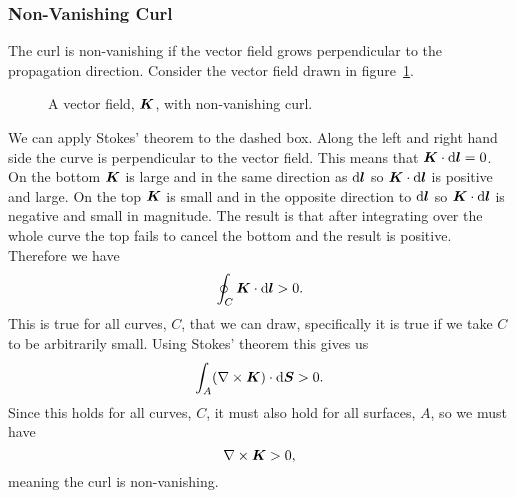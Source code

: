     \subsubsection{Non-Vanishing Curl}
    The curl is non-vanishing if the vector field grows perpendicular to the propagation direction.
    Consider the vector field drawn in figure~\ref{fig:non-vanishing curl}.
    \begin{figure}[ht]
        \centering
        \caption{A vector field, \(\bm{K}\), with non-vanishing curl.}
        \label{fig:non-vanishing curl}
    \end{figure}
    We can apply Stokes' theorem to the dashed box.
    Along the left and right hand side the curve is perpendicular to the vector field.
    This means that \(\bm{K}\cdot\dd\bm{l} = 0\).
    On the bottom \(\bm{K}\) is large and in the same direction as \(\dd\bm{l}\) so \(\bm{K}\cdot\dd\bm{l}\) is positive and large.
    On the top \(\bm{K}\) is small and in the opposite direction to \(\dd\bm{l}\) so \(\bm{K}\cdot\dd\bm{l}\) is negative and small in magnitude.
    The result is that after integrating over the whole curve the top fails to cancel the bottom and the result is positive.
    Therefore we have
    \[\oint_C \bm{K}\cdot\dd\bm{l} > 0.\]
    This is true for all curves, \(C\), that we can draw, specifically it is true if we take \(C\) to be arbitrarily small.
    Using Stokes' theorem this gives us
    \[\int_A(\nabla\times\bm{K})\cdot\dd\bm{S} > 0.\]
    Since this holds for all curves, \(C\), it must also hold for all surfaces, \(A\), so we must have
    \[\nabla\times\bm{K} > 0,\]
    meaning the curl is non-vanishing.
    
